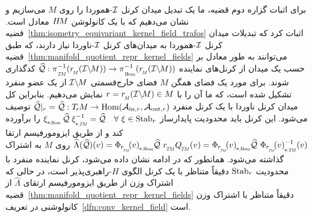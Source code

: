 برای اثبات گزاره دوم قضیه، ما یک تبدیل میدان کرنل $\mathcal{I}$-هموردا را روی $M$ می‌سازیم و نشان می‌دهیم که با یک کانولوشن $H\mkern-2.5muM$ معادل است.
قضیه~\ref{thm:isometry_equivariant_kernel_field_trafos} اثبات کرد که تبدیلات میدان کرنل $\mathcal{I}$-هموردا به میدان‌های کرنل $\mathcal{I}$-ناوردا نیاز دارند، که طبق قضیه~\ref{thm:manifold_quotient_repr_kernel_fields} می‌توانند به طور معادل بر حسب یک میدان از کرنل‌های نماینده $\Qhat: \piTM^{-1}(\rM(\IM)) \to \piHom^{-1}(\rM(\IM))$ کدگذاری شوند.
برای مورد یک فضای همگن $M$ فضای خارج‌قسمتی $\mathcal{I}\backslash\mkern-1.5mu M$ از یک عضو منفرد تشکیل شده است، که ما آن را با $r=\rM(\IM) \in M$ نمایش می‌دهیم.
بنابراین کل میدان کرنل ناوردا با یک کرنل منفرد $\Qhat|_r = \Qhat: \TrM \to \Hom(\Ainr,\Aoutr)$ توصیف می‌شود.
این کرنل باید محدودیت پایدارساز
$\dxiHom \Qhat\; \dxiTM^{-1} = \Qhat \quad \forall\ \xi \in \Stab{r}$
را برآورده کند و از طریق ایزومورفیسم ارتقا
$\widehat{\Lambda}(\Qhat)(v) = \dPhirHom{v} \Qhat\ \rTM \QTM (v) = \dPhirHom{v} \Qhat\ \dPhirTM{v}^{-1}(v)$ روی $M$ به اشتراک گذاشته می‌شود.
همانطور که در ادامه نشان داده می‌شود، کرنل نماینده منفرد با محدودیت $\operatorname{Stab}_{r}$ دقیقاً متناظر با یک کرنل الگوی $H$-راهبری‌پذیر است، در حالی که اشتراک وزن از طریق ایزومورفیسم ارتقای $\widehat{\Lambda}$ از قضیه~\ref{thm:manifold_quotient_repr_kernel_fields} دقیقاً متناظر با اشتراک وزن کانولوشنی در تعریف~\ref{dfn:conv_kernel_field} است.


